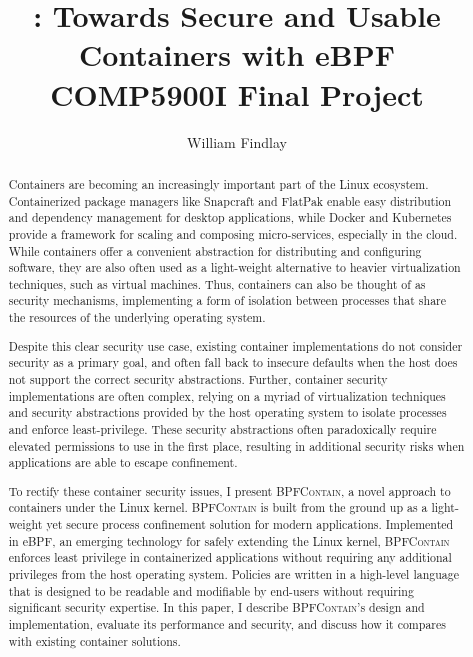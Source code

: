 \documentclass[dvipsnames, 12pt]{article}
\title{\Large \bpfcontain: Towards Secure and Usable Containers with eBPF\\{\large COMP5900I Final Project}}
\author{William Findlay}
\def\bpfcontain{\textsc{BPFContain}}
\begin{document}

\maketitle
\thispagestyle{empty}

\vfill
\begin{abstract}
\noindent
{}
Containers are becoming an increasingly important part of the Linux ecosystem.  Containerized package managers like Snapcraft \cite{snap} and FlatPak \cite{flatpak} enable easy distribution and dependency management for desktop applications, while Docker \cite{docker} and Kubernetes \cite{kubernetes} provide a framework for scaling and composing micro-services, especially in the cloud.  While containers offer a convenient abstraction for distributing and configuring software, they are also often used as a light-weight alternative to heavier virtualization techniques, such as virtual machines. Thus, containers can also be thought of as security mechanisms, implementing a form of isolation between processes that share the resources of the underlying operating system.

Despite this clear security use case, existing container implementations do not consider security as a primary goal, and often fall back to insecure defaults when the host does not support the correct security abstractions. Further, container security implementations are often complex, relying on a myriad of virtualization techniques and security abstractions provided by the host operating system to isolate processes and enforce least-privilege. These security abstractions often paradoxically require elevated permissions to use in the first place, resulting in additional security risks when applications are able to escape confinement.

To rectify these container security issues, I present \bpfcontain{}, a novel approach to containers under the Linux kernel. \bpfcontain{} is built from the ground up as a light-weight yet secure process confinement solution for modern applications. Implemented in eBPF, an emerging technology for safely extending the Linux kernel, \bpfcontain{} enforces least privilege in containerized applications without requiring any additional privileges from the host operating system. Policies are written in a high-level language that is designed to be readable and modifiable by end-users without requiring significant security expertise. In this paper, I describe \bpfcontain{}'s design and implementation, evaluate its performance and security, and discuss how it compares with existing container solutions.

\end{abstract}
\vfill
\vfill
\end{document}
